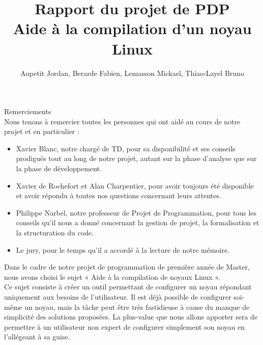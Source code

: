 \documentclass[16pts]{report}
\title{Rapport du projet de PDP \\ Aide à la compilation d'un noyau Linux}
\author{Aupetit Jordan, Berarde Fabien, Lemasson Mickael, Thiao-Layel Bruno}
\begin{document}
\maketitle
\clearpage

Remerciements\\

Nous tenons à remercier toutes les personnes qui ont aidé au cours de notre 
projet et en particulier :\\

\begin{itemize}
  \item Xavier Blanc, notre chargé de TD, pour sa disponibilité et ses conseils 
  prodigués tout au long de notre projet, autant sur la phase d'analyse 
  que sur la phase de développement.\\

  \item Xavier de Rochefort et Alan Charpentier, pour avoir toujours été 
  disponible et avoir répondu à toutes nos questions concernant leurs 
  attentes. \\

  \item Philippe Narbel, notre professeur de Projet de Programmation, pour 
  tous les conseils qu'il nous a donné concernant la gestion de projet, la 
  formalisation et la structuration du code.\\

\item Le jury, pour le temps qu'il a accordé à la lecture de notre 
  mémoire.\\

\end{itemize}

\tableofcontents
\clearpage

\nocite{*}

Dans le cadre de notre projet de programmation de première année de Master, 
nous avons choisi le sujet « Aide à la compilation de noyaux Linux ».
\\

Ce sujet consiste à créer un outil permettant de configurer un noyau répondant 
uniquement aux besoins de l'utilisateur. Il est déjà possible de 
configurer soi-même un noyau, mais la tâche peut être très fastidieuse 
à cause du manque de simplicité des solutions proposées. La plus-value 
que nous allons apporter sera de permettre à un utilisateur non expert 
de configurer simplement son noyau en l'allégeant à sa guise.
\\
\end{document}
